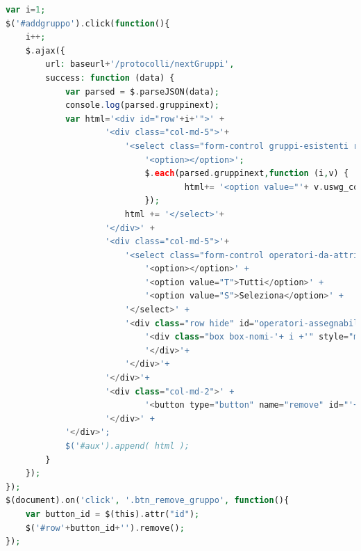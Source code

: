         \begin{lstlisting}[language=PHP, caption= JQuery per nuova riga]
var i=1;
$('#addgruppo').click(function(){
    i++;
    $.ajax({
        url: baseurl+'/protocolli/nextGruppi',
        success: function (data) {
            var parsed = $.parseJSON(data);
            console.log(parsed.gruppinext);
            var html='<div id="row'+i+'">' +
                    '<div class="col-md-5">'+
                        '<select class="form-control gruppi-esistenti required" id="'+i+'" name="gruppi[sezione][]">' +
                            '<option></option>';
                            $.each(parsed.gruppinext,function (i,v) {
                                    html+= '<option value="'+ v.uswg_codice +'">'+ v.uswg_descrizione +'</option>'
                            });
                        html += '</select>'+
                    '</div>' +
                    '<div class="col-md-5">'+
                        '<select class="form-control operatori-da-attribuire required" id="'+i+name="gruppi[contatti][]">' +
                            '<option></option>' +
                            '<option value="T">Tutti</option>' +
                            '<option value="S">Seleziona</option>' +
                        '</select>' +
                        '<div class="row hide" id="operatori-assegnabili-'+i+'">' +
                            '<div class="box box-nomi-'+ i +'" style="margin-top: 1em; padding-left: 5px;">' +
                            '</div>'+
                        '</div>'+
                    '</div>'+
                    '<div class="col-md-2">' +
                            '<button type="button" name="remove" id="'+i+'" class="btn btn-danger btn_remove_gruppo">Elimina</button>' +
                    '</div>' +
            '</div>';
            $('#aux').append( html );
        }
    });
});
$(document).on('click', '.btn_remove_gruppo', function(){
    var button_id = $(this).attr("id");
    $('#row'+button_id+'').remove();
});
        \end{lstlisting}
        
